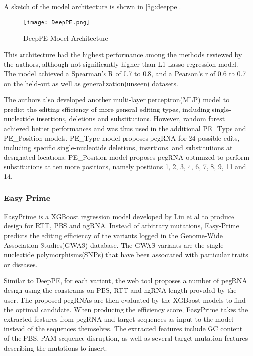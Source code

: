 \documentclass[12pt]{article}
\begin{document}
A sketch of the model architecture is shown in \autoref{fig:deeppe}.

\begin{figure}[ht]
    \centering
    \texttt{[image: DeepPE.png]}
    \caption{DeepPE Model Architecture}
    \label{fig:deeppe}
\end{figure}

This architecture had the highest performance among the methods reviewed by the authors, although not significantly higher than L1 Lasso regression model. The model achieved a Spearman's R of 0.7 to 0.8, and a Pearson's r of 0.6 to 0.7 on the held-out as well as generalization(unseen) datasets.

The authors also developed another multi-layer perceptron(MLP) model to predict the editing efficiency of more general editing types, including single-nucleotide insertions, deletions and substitutions. However, random forest achieved better performances and was thus used in the additional PE\_Type and PE\_Position models. PE\_Type model proposes pegRNA for 24 possible edits, including specific single-nucleotide deletions, insertions, and substitutions at designated locations. PE\_Position model proposes pegRNA optimized to perform substitutions at ten more positions, namely positions 1, 2, 3, 4, 6, 7, 8, 9, 11 and 14.

\subsubsection{Easy Prime}

EasyPrime is a XGBoost regression model developed by Liu et al to produce design for RTT, PBS and ngRNA. Instead of arbitrary mutations, Easy-Prime predicts the editing efficiency of the variants logged in the Genome-Wide Association Studies(GWAS) database. The GWAS variants are the single nucleotide polymorphisms(SNPs) that have been associated with particular traits or diseases.

Similar to DeepPE, for each variant, the web tool proposes a number of pegRNA design using the constrains on PBS, RTT and ngRNA length provided by the user. The proposed pegRNAs are then evaluated by the XGBoost models to find the optimal candidate. When producing the efficiency score, EasyPrime takes the extracted features from pegRNA and target sequences as input to the model instead of the sequences themselves. The extracted features include GC content of the PBS, PAM sequence disruption, as well as several target mutation features describing the mutations to insert.
\end{document}
